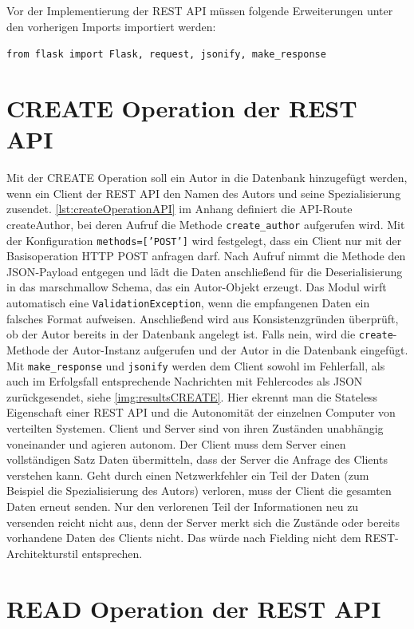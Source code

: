 \documentclass[a4paper,titlepage,halfparskip,12pt,listof=numbered]{scrreprt}
\begin{document}
\begin{onehalfspacing}
Vor der Implementierung der \ac{REST} \ac{API} müssen folgende Erweiterungen unter den vorherigen Imports importiert werden:

\texttt{from flask import Flask, request, jsonify, make\_response}

\section{CREATE Operation der \ac{REST} \ac{API}}
\label{sec:createAPI}

Mit der CREATE Operation soll ein Autor in die Datenbank hinzugefügt werden, wenn ein Client der \ac{REST} \ac{API} den Namen des Autors und seine Spezialisierung zusendet. \autoref{lst:createOperationAPI} im Anhang definiert die \ac{API}-Route \glqq createAuthor\grqq, bei deren Aufruf die Methode \texttt{create\_author} aufgerufen wird. Mit der Konfiguration \texttt{methods=['POST']} wird festgelegt, dass ein Client nur mit der Basisoperation \ac{HTTP} POST anfragen darf. Nach Aufruf nimmt die Methode den \ac{JSON}-Payload entgegen und lädt die Daten anschließend für die Deserialisierung in das marschmallow Schema, das ein Autor-Objekt erzeugt. Das Modul wirft automatisch eine \texttt{ValidationException}, wenn die empfangenen Daten ein falsches Format aufweisen. Anschließend wird aus Konsistenzgründen überprüft, ob der Autor bereits in der Datenbank angelegt ist. Falls nein, wird die \texttt{create}-Methode der Autor-Instanz aufgerufen und der Autor in die Datenbank eingefügt. Mit \texttt{make\_response} und \texttt{jsonify} werden dem Client sowohl im Fehlerfall, als auch im Erfolgsfall entsprechende Nachrichten mit Fehlercodes als \ac{JSON} zurückgesendet, siehe \autoref{img:resultsCREATE}. Hier ekrennt man die Stateless Eigenschaft einer \ac{REST} \ac{API} und die Autonomität der einzelnen Computer von verteilten Systemen. Client und Server sind von ihren Zuständen unabhängig voneinander und agieren autonom. Der Client muss dem Server einen vollständigen Satz Daten übermitteln, dass der Server die Anfrage des Clients verstehen kann. Geht durch einen Netzwerkfehler ein Teil der Daten (zum Beispiel die Spezialisierung des Autors) verloren, muss der Client die gesamten Daten erneut senden. Nur den verlorenen Teil der Informationen neu zu versenden reicht nicht aus, denn der Server merkt sich die Zustände oder bereits vorhandene Daten des Clients nicht. Das würde nach Fielding \cite[S.78ff.]{fieldingREST} nicht dem \ac{REST}-Architekturstil entsprechen.

\section{READ Operation der \ac{REST} \ac{API}}
\label{sec:readAPI}


\end{onehalfspacing}
\end{document}
